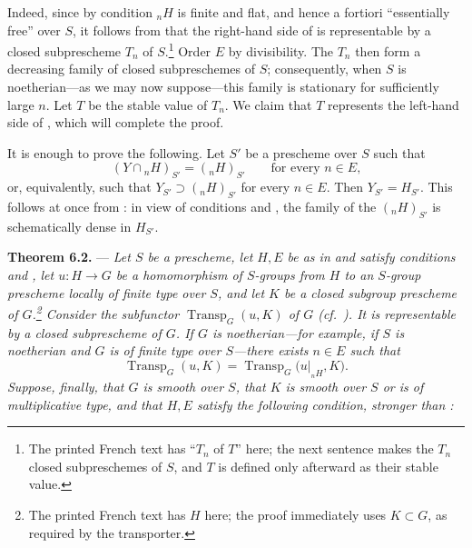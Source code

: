Indeed, since by condition  \({}_nH\) is
finite and flat, and hence a fortiori ``essentially free'' over \(S\),
it follows from  that the right-hand side of
 is representable by a closed
subprescheme \(T_n\) of \(S\).\footnote{The printed French text has
``\(T_n\) of \(T\)'' here; the next sentence makes the \(T_n\) closed
subpreschemes of \(S\), and \(T\) is defined only afterward as their
stable value.}  Order \(E\) by divisibility.  The
\(T_n\) then form a decreasing family of closed subpreschemes of
\(S\); consequently, when \(S\) is noetherian---as we may now
suppose---this family is stationary for sufficiently large \(n\).
Let \(T\) be the stable value of \(T_n\).  We claim that \(T\)
represents the left-hand side of , which will complete
the proof.

It is enough to prove the following.  Let \(S'\) be a prescheme over
\(S\) such that
\[
  (Y\cap{}_nH)_{S'}=({}_nH)_{S'}
  \qquad\text{for every \(n\in E\),}
\]
or, equivalently, such that
\(Y_{S'}\supset({}_nH)_{S'}\) for every \(n\in E\).  Then
\(Y_{S'}=H_{S'}\).  This follows at once from :
in view of conditions  and , the family of the
\(({}_nH)_{S'}\) is schematically dense in \(H_{S'}\).

\medskip
\noindent{}\textbf{Theorem 6.2.} ---
\textit{Let \(S\) be a prescheme, let \(H,E\) be as in
 and satisfy conditions
 and
, let
\(u:H\to G\) be a homomorphism of \(S\)-groups from \(H\) to an
\(S\)-group prescheme locally of finite type over \(S\), and let
\(K\) be a closed subgroup prescheme of \(G\).\footnote{The printed
French text has \(H\) here; the proof immediately uses \(K\subset G\),
as required by the transporter.}  Consider the
subfunctor \(\operatorname{Transp}_G(u,K)\) of \(G\) (cf.\ ).
It is representable by a closed subprescheme of \(G\).  If \(G\) is
noetherian---for example, if \(S\) is noetherian and \(G\) is of
finite type over \(S\)---there exists \(n\in E\) such that}
\[
  \operatorname{Transp}_G(u,K)
  =
  \operatorname{Transp}_G\bigl(u|_{{}_nH},K\bigr).
\]
\textit{Suppose, finally, that \(G\) is smooth over \(S\), that
\(K\) is smooth over \(S\) or is of multiplicative type, and that
\(H,E\) satisfy the following condition, stronger than :}

